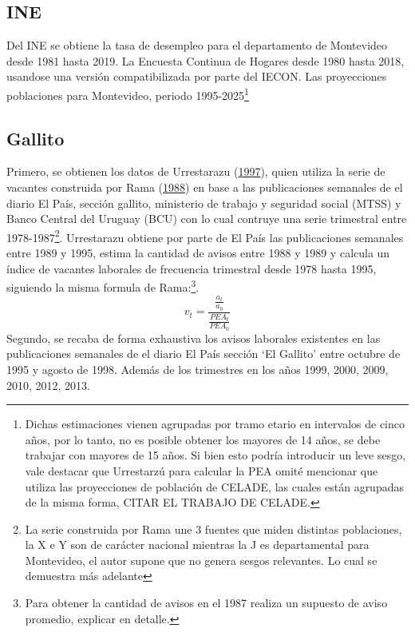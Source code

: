 \documentclass[12pt,twoside]{reedthesis}
\begin{document}
\hypertarget{ine}{%
\subsection*{INE}\label{ine}}

Del INE se obtiene la tasa de desempleo para el departamento de Montevideo desde 1981 hasta 2019.
La Encuesta Continua de Hogares desde 1980 hasta 2018, usandose una versión compatibilizada por parte del IECON.
Las proyecciones poblaciones para Montevideo, periodo 1995-2025\footnote{Dichas estimaciones vienen agrupadas por tramo etario en intervalos de cinco años, por lo tanto, no es posible obtener los mayores de 14 años, se debe trabajar con mayores de 15 años. Si bien esto podría introducir un leve sesgo, vale destacar que Urrestarzú para calcular la PEA omité mencionar que utiliza las proyecciones de población de CELADE, las cuales están agrupadas de la misma forma, CITAR EL TRABAJO DE CELADE.}

\hypertarget{gallito}{%
\subsection*{Gallito}\label{gallito}}

Primero, se obtienen los datos de Urrestarazu (\protect\hyperlink{ref-Urrestarazu1997}{1997}), quien utiliza la serie de vacantes construida por Rama (\protect\hyperlink{ref-Rama1988}{1988}) en base a las publicaciones semanales de el diario El País, sección gallito, ministerio de trabajo y seguridad social (MTSS) y Banco Central del Uruguay (BCU) con lo cual contruye una serie trimestral entre 1978-1987\footnote{La serie construida por Rama une 3 fuentes que miden distintas poblaciones, la  X e Y son de carácter nacional mientras la J es departamental para Montevideo, el autor supone que no genera sesgos relevantes. Lo cual se demuestra más adelante}. Urrestarazu obtiene por parte de El País las publicaciones semanales entre 1989 y 1995, estima la cantidad de avisos entre 1988 y 1989 y calcula un índice de vacantes laborales de frecuencia trimestral desde 1978 hasta 1995, siguiendo la misma formula de Rama:\footnote{Para obtener la cantidad de avisos en el 1987 realiza un supuesto de aviso promedio, explicar en detalle.}.
\begin{equation}
v_t = \frac{\frac{a_t}{a_0}}{\frac{PEA_t}{PEA_0}}
\end{equation}
Segundo, se recaba de forma exhaustiva los avisos laborales existentes en las publicaciones semanales de el diario El País sección `El Gallito' entre octubre de 1995 y agosto de 1998. Además de los trimestres en los años 1999, 2000, 2009, 2010, 2012, 2013.
\end{document}
